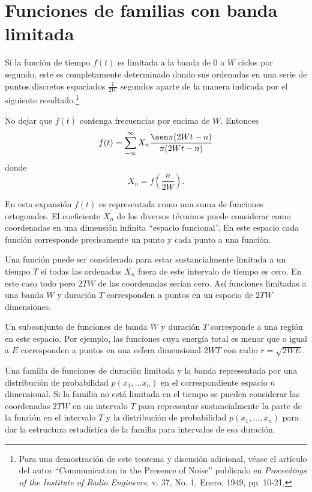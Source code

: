 \section{Funciones de familias con banda limitada}

Si la funci\'on de tiempo $f(t)$ es limitada a la banda de 0 a $W$
ciclos por segundo, este es completamente determinado dando sus
ordenadas en una serie de puntos discretos espaciados $\frac{1}{2W}$
segundos aparte de la manera indicada por el siguiente
resultado.\footnote[5]{Para una demostraci\'on de este teorema y
discusi\'on adicional, v\'ease el art\'iculo del autor ``Communication
in the Presence of Noise'' publicado en {\em Proceedings of the
Institute of Radio Engineers}, v. 37, No. 1, Enero, 1949, pp. 10-21.}

\begin{theorem}
  No dejar que $f(t)$ contenga frecuencias por encima de $W$. Entonces
  \begin{equation}
    f(t) = \sum_{-\infty}^{\infty} X_n \frac{\sen \pi(2Wt-n)}{\pi(2Wt-n)}
  \end{equation}
  donde
  \begin{equation}
    X_n = f\left(\frac{n}{2W} \right).
  \end{equation}
\end{theorem}

En esta expansi\'on $f(t)$ es representada como una suma de funciones
ortogonales. El coeficiente $X_n$ de los diversos t\'erminos puede
considerar como coordenadas en una dimensi\'on infinita ``espacio
funcional''. En este espacio cada funci\'on corresponde precisamente
un punto y cada punto a una funci\'on.

Una funci\'on puede ser considerada para estar sustancialmente
limitada a un tiempo $T$ si todas las ordenadas $X_n$ fuera de este
intervalo de tiempo es cero. En este caso todo pero $2TW$ de las
coordenadas ser\'ian cero. As\'i funciones limitadas a una banda $W$ y
duraci\'on $T$ corresponden a puntos en un espacio de $2TW$
dimensiones.

Un subconjunto de funciones de banda $W$ y duraci\'on $T$ corresponde
a una regi\'on en este espacio. Por ejemplo, las funciones cuya
energ\'ia total es menor que o igual a $E$ corresponden a puntos en
una esfera dimensional $2WT$ con radio $r=\sqrt{2WE}$.

Una familia de funciones de duraci\'on limitada y la banda
representada por una distribuci\'on de probabilidad $p(x_1, \ldots
x_n)$ en el correspondiente espacio $n$ dimensional. Si la familia no
est\'a limitada en el tiempo se pueden considerar las coordenadas
$2TW$ en un intervalo $T$ para representar sustancialmente la parte de
la funci\'on en el intervalo $T$ y la distribuci\'on de probabilidad
$p(x_1, \ldots, x_n)$ para dar la estructura estad\'istica de la familia
para intervalos de esa duraci\'on.

